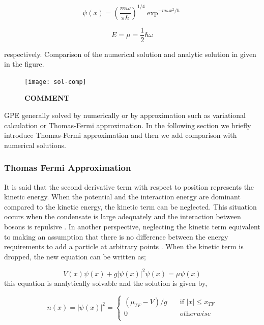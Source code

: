 \documentclass[a4paper,times,hidelinks,12pt]{article}
\begin{document}
\begin{equation}
\label{eq:harmonic_ground_state_wave}
    \psi(x) = (\frac{m\omega}{\pi\hbar})^{1/4}\exp^{-m\omega x^2/\hbar}
\end{equation}

\begin{equation}
\label{eq:GPE_1D_solution_harmonic}
    E = \mu = \frac{1}{2}\hbar\omega
\end{equation}

\noindent respectively. Comparison of the numerical solution and analytic solution in given in the figure.

\graphicspath{{"../figs/numericanalyze/"}}
\begin{figure}[H]
\centering
    \texttt{[image: sol-comp]}
\caption{\textbf{COMMENT}}
\label{fig:dens_energy_error}
\end{figure}





GPE generally solved by numerically or by approximation such as variational calculation or Thomas-Fermi approximation. In the following section we briefly introduce Thomas-Fermi approximation and then we add comparison with numerical solutions. 

\subsubsection{Thomas Fermi Approximation}



It is said that the second derivative term with respect to position represents the kinetic energy. When the potential and the interaction energy are dominant compared to the kinetic energy, the kinetic term can be neglected. This situation occurs when the condensate is large adequately and the interaction between bosons is repulsive \cite{pethick2002bose}. In another perspective, neglecting the kinetic term equivalent to making an assumption that there is no difference between the energy requirements to add a particle at arbitrary points \cite{rogel2013gross}. When the kinetic term is dropped, the new equation can be written as;

\begin{equation}
\label{eq:GPE_1D_thomas_fermi}
    V(x)\psi(x) + g|\psi(x)|^2\psi(x) = \mu\psi(x)
\end{equation}
\noindent this equation is analytically solvable and the solution is given by,


\begin{equation}
\label{eq:thomas_fermi_solution}    
n(x) = |\psi(x)|^2 =  
    \begin{cases}
        (\mu_{TF} - V)/g &\quad\text{if }  |x| \le x_{TF}  \\
        0 &\quad \textit{otherwise} \\
    \end{cases}
\end{equation}
\end{document}

